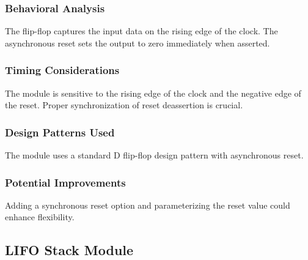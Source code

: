\documentclass[10pt]{article}
\begin{document}
\subsubsection{Behavioral Analysis}
The flip-flop captures the input data on the rising edge of the clock. The asynchronous reset sets the output to zero immediately when asserted.

\subsubsection{Timing Considerations}
The module is sensitive to the rising edge of the clock and the negative edge of the reset. Proper synchronization of reset deassertion is crucial.

\subsubsection{Design Patterns Used}
The module uses a standard D flip-flop design pattern with asynchronous reset.

\subsubsection{Potential Improvements}
Adding a synchronous reset option and parameterizing the reset value could enhance flexibility.

\subsection{LIFO Stack Module}
\end{document}
